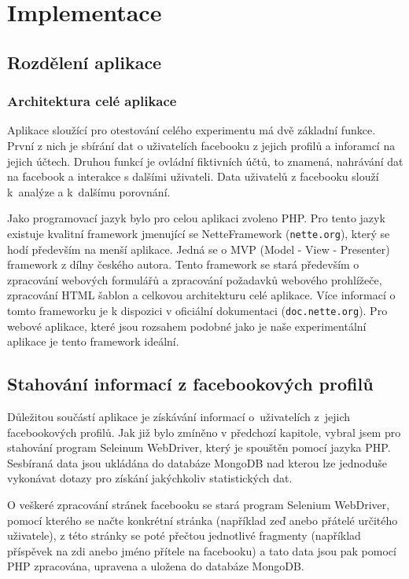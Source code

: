 \documentclass[thesis=M,czech]{FITthesis}[2013/05/10]
\begin{document}
\chapter{Implementace}

\section{Rozdělení aplikace}

\subsection{Architektura celé aplikace}

Aplikace sloužící pro otestování celého experimentu má dvě základní funkce. První z nich je sbírání dat o uživatelích facebooku z jejich profilů a inforamcí na jejich účtech. Druhou funkcí je ovládní fiktivních účtů, to znamená, nahrávání dat na facebook a interakce s dalšími uživateli. Data uživatelů z facebooku slouží k~analýze a k~dalšímu porovnání.

Jako programovací jazyk bylo pro celou aplikaci zvoleno PHP. Pro tento jazyk existuje kvalitní framework jmenující se NetteFramework (\verb|nette.org|), který se hodí především na menší aplikace. Jedná se o MVP (Model - View - Presenter) framework z dílny českého autora. Tento framework se stará především o zpracování webových formulářů a zpracování požadavků webového prohlížeče, zpracování HTML šablon a celkovou architekturu celé aplikace. Více informací o tomto frameworku je k dispozici v oficiální dokumentaci (\verb|doc.nette.org|). Pro webové aplikace, které jsou rozsahem podobné jako je naše experimentální aplikace je tento framework ideální.


\section{Stahování informací z facebookových profilů}

Důležitou součástí aplikace je získávání informací o~uživatelích z~jejich facebookových profilů. Jak již bylo zmíněno v předchozí kapitole, vybral jsem pro stahování program Seleinum WebDriver, který je spouštěn pomocí jazyka PHP. Sesbíraná data jsou ukládána do databáze MongoDB nad kterou lze jednoduše vykonávat dotazy pro získání jakýchkoliv statistických dat.

O veškeré zpracování stránek facebooku se stará program Selenium WebDriver, pomocí kterého se načte konkrétní stránka (například zeď anebo přátelé určitého uživatele), z této stránky se poté přečtou jednotlivé fragmenty (například příspěvek na zdi anebo jméno přítele na facebooku) a tato data jsou pak pomocí PHP zpracována, upravena a uložena do databáze MongoDB. 
\end{document}

